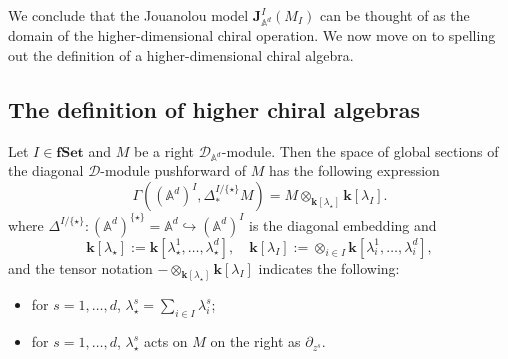 \documentclass[11pt]{amsart}
\theoremstyle{definition}
\theoremstyle{remark}
\numberwithin{equation}{section}
\newcommand{\kk}{\mathbf{k}}
\begin{document}
    We conclude that the Jouanolou model $\mathbf{J}_{\mathbb{A}^d}^{{I}}(M_{{I}})$ can be thought of as the domain of the higher-dimensional chiral operation.
    We now move on to spelling out the definition of a higher-dimensional chiral algebra.

    \subsection{The definition of higher chiral algebras}

Let ${I}\in {\mathbf{fSet}}$ and $M$ be a right $\mathcal{D}_{\mathbb{A}^d}$-module. Then the space of global sections
of the diagonal $\mathcal{D}$-module pushforward of $M$ has the following expression
$$
\Gamma\left((\mathbb{A}^d)^{{I}},\Delta^{I/\{\star\}} _*M\right)=M\otimes_{\kk[\lambda_{\star}]}\kk[\lambda_I].
$$
where $\Delta^{I/\{\star\}} \colon (\mathbb{A}^d)^{\{\star\}} = \mathbb{A}^d \hookrightarrow(\mathbb{A}^d)^{I}$ is the diagonal
embedding and
$$
\kk[\lambda_{\star}]:=\kk[\lambda^1_{\star},\dots,\lambda^d_{\star}], \quad \kk[\lambda_{I}]:=\otimes_{{i\in I}}\kk[\lambda^1_{i},\dots,\lambda^d_{i}],
$$
and the tensor notation $-\otimes_{\kk[\lambda_{\star}]}\kk[\lambda_I]$ indicates the following:
\begin{itemize}
  \item for $s=1,\dots,d$, $\lambda^s_{\star}=\sum\limits_{i\in I}\lambda^s_i$;
  \item for $s=1,\dots,d$, $\lambda^s_{\star}$ acts on $M$ on the right as $\partial_{z^s}$.
\end{itemize}
\end{document}

